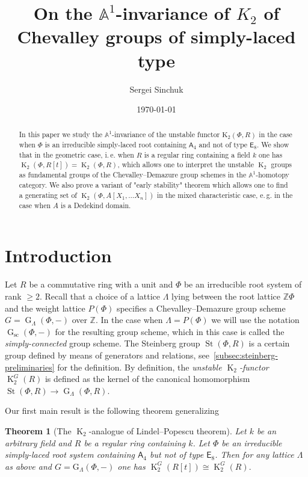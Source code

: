 \documentclass[oneside, 10pt]{amsart}
\title{On the $\mathbb{A}^1$-invariance of $K_2$ of Chevalley groups of simply-laced type}
\author {Sergei Sinchuk}
\date {\today}
\DeclareMathOperator{\St}{St}
\DeclareMathOperator{\G}{G}
\newcommand{\Gsc}{\G_\mathrm{sc}}
\DeclareMathOperator{\K}{K}
\newcommand{\rA}{\mathsf{A}}
\newcommand{\rE}{\mathsf{E}}
\newcommand{\ZZ}{\mathbb{Z}}
\newtheorem{thm}{Theorem}
\numberwithin{equation}{section}
\numberwithin{thm}{section}
\numberwithin{lemma}{section}
\theoremstyle{definition}
\theoremstyle{remark}
\begin{document}
    \maketitle


\begin{abstract}
In this paper we study the $\mathbb{A}^1$-invariance of the unstable functor $\mathrm{K}_2(\Phi, R)$
in the case when $\Phi$ is an irreducible simply-laced root containing $\rA_4$ and not of type $\rE_8$.
We show that in the geometric case, i.\,e. when $R$ is a regular ring containing a field $k$
one has $\K_2(\Phi, R[t]) = \K_2(\Phi, R)$, which allows one to interpret the unstable $\K_2$ groups
as fundamental groups of the Chevalley--Demazure group schemes in the $\mathbb{A}^1$-homotopy category.
We also prove a variant of "early stability" theorem which allows one to find a generating set
of $\K_2(\Phi, A[X_1, \ldots X_n])$ in the mixed characteristic case, e.\,g. in the case when $A$ is a Dedekind domain.
\end{abstract}

    \section{Introduction}\label{sec:introduction}


Let $R$ be a commutative ring with a unit and $\Phi$ be an irreducible root system of rank $\geq 2$.
Recall that a choice of a lattice $\Lambda$ lying between the root lattice $\mathbb{Z}\Phi$ and the weight lattice $P(\Phi)$
 specifies a Chevalley--Demazure group scheme $G=\G_\Lambda(\Phi, -)$ over $\ZZ$.
In the case when $\Lambda = P(\Phi)$ we will use the notation $\Gsc(\Phi, -)$ for the resulting group scheme,
 which in this case is called the \textit{simply-connected} group scheme.
The Steinberg group $\St(\Phi, R)$ is a certain group defined by means of generators and relations, see~\cref{subsec:steinberg-preliminaries} for the definition.
By definition, the \textit{unstable $\K_2$-functor} $\K_2^G(R)$ is defined as the kernel of the canonical homomorphism $\St(\Phi, R) \to \G_\Lambda(\Phi, R)$.

Our first main result is the following theorem generalizing~\cite[Theorem~1.1]{LSV2}
\begin{thm}[The $\K_2$-analogue of Lindel--Popescu theorem] \label{thm:LP-for-K2}
 Let $k$ be an arbitrary field and $R$ be a regular ring containing $k$.
 Let $\Phi$ be an irreducible simply-laced root system containing $\rA_4$ but not of type $\rE_8$.
 Then for any lattice $\Lambda$ as above and $G = \mathrm{G}_\Lambda(\Phi, -)$ one has
 $\K_2^G(R[t])\cong\K_2^G(R).$
\end{thm}
\end{document}
